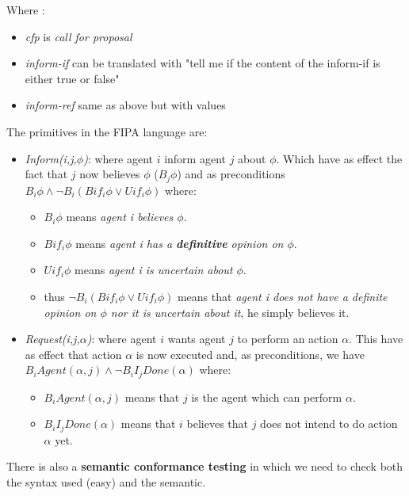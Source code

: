 \documentclass[10pt,a4paper]{article}
\begin{document}
Where :
\begin{itemize}
\item \textit{cfp} is \textit{call for proposal}
\item \textit{inform-if} can be translated with "tell me if the content of the inform-if is either true or false"
\item \textit{inform-ref} same as above but with values
\end{itemize}

The primitives in the FIPA language are:
\begin{itemize}
\item \textit{Inform(i,j,$\phi$)}: where agent $i$ inform agent $j$ about $\phi$. Which have as effect the fact that $j$ now believes $\phi$ ($B_j\phi$) and as preconditions $B_i\phi \wedge \neg B_i(Bif_i\phi \vee Uif_i\phi)$
where:

\begin{itemize}
\item $B_i\phi$ means \textit{agent i believes $\phi$}.
\item $Bif_i\phi$ means \textit{agent i has a \textbf{definitive} opinion on $\phi$}.
\item $Uif_i\phi$ means \textit{agent i is uncertain about $\phi$}.
\item thus $\neg B_i(Bif_i\phi \vee Uif_i\phi)$ means that \textit{agent i does not have a definite opinion on $\phi$ nor it is uncertain about it}, he simply believes it.
\end{itemize}

\item \textit{Request(i,j,$\alpha$)}: where agent $i$ wants agent $j$ to perform an action $\alpha$. This have as effect that action $\alpha$ is now executed and, as preconditions, we have $B_iAgent(\alpha,j) \wedge \neg B_iI_jDone(\alpha)$
where:

\begin{itemize}
\item $B_iAgent(\alpha,j)$ means that $j$ is the agent which can perform $\alpha$.
\item $B_iI_jDone(\alpha)$ means that $i$ believes that $j$ does not intend to do action $\alpha$ yet.
\end{itemize}
\end{itemize}

There is also a \textbf{semantic conformance testing} in which we need to check both the syntax used (easy) and the semantic.
\end{document}
